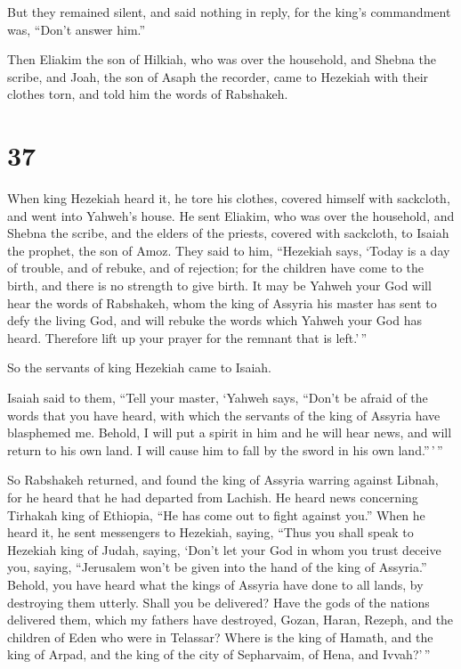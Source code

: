  But they remained silent, and said nothing in reply, for
the king's commandment was, ``Don't answer him.''

 Then Eliakim the son of Hilkiah, who was over the
household, and Shebna the scribe, and Joah, the son of Asaph the
recorder, came to Hezekiah with their clothes torn, and told him the
words of Rabshakeh.

\hypertarget{section-35}{%
\section{37}\label{section-35}}

 When king Hezekiah heard it, he tore his clothes, covered
himself with sackcloth, and went into Yahweh's house.  He
sent Eliakim, who was over the household, and Shebna the scribe, and the
elders of the priests, covered with sackcloth, to Isaiah the prophet,
the son of Amoz.  They said to him, ``Hezekiah says, `Today
is a day of trouble, and of rebuke, and of rejection; for the children
have come to the birth, and there is no strength to give birth.
 It may be Yahweh your God will hear the words of Rabshakeh,
whom the king of Assyria his master has sent to defy the living God, and
will rebuke the words which Yahweh your God has heard. Therefore lift up
your prayer for the remnant that is left.'\,''

 So the servants of king Hezekiah came to Isaiah.

 Isaiah said to them, ``Tell your master, `Yahweh says,
``Don't be afraid of the words that you have heard, with which the
servants of the king of Assyria have blasphemed me.  Behold,
I will put a spirit in him and he will hear news, and will return to his
own land. I will cause him to fall by the sword in his own
land.''\,'\,''

 So Rabshakeh returned, and found the king of Assyria
warring against Libnah, for he heard that he had departed from Lachish.
 He heard news concerning Tirhakah king of Ethiopia, ``He
has come out to fight against you.'' When he heard it, he sent
messengers to Hezekiah, saying,  ``Thus you shall speak to
Hezekiah king of Judah, saying, `Don't let your God in whom you trust
deceive you, saying, ``Jerusalem won't be given into the hand of the
king of Assyria.''  Behold, you have heard what the kings
of Assyria have done to all lands, by destroying them utterly. Shall you
be delivered?  Have the gods of the nations delivered them,
which my fathers have destroyed, Gozan, Haran, Rezeph, and the children
of Eden who were in Telassar?  Where is the king of Hamath,
and the king of Arpad, and the king of the city of Sepharvaim, of Hena,
and Ivvah?'\,''


